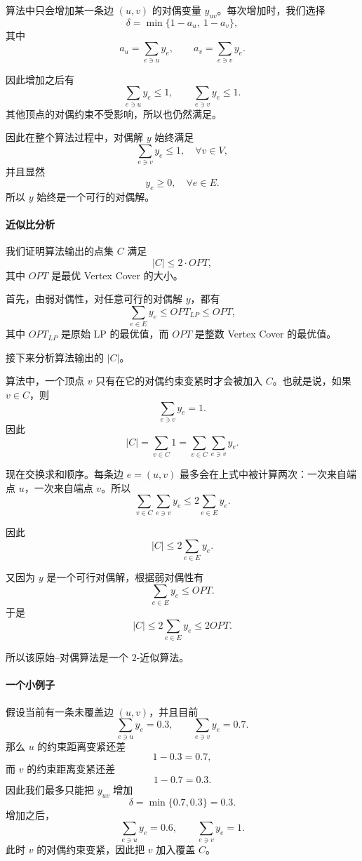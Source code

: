 \documentclass[UTF8,openany,12pt]{ctexbook}
\theoremstyle{remark}
\begin{document}
算法中只会增加某一条边 \((u,v)\) 的对偶变量 \(y_{uv}\)。每次增加时，我们选择
\[
  \delta=\min\{1-a_u,\ 1-a_v\},
\]
其中
\[
  a_u=\sum_{e\ni u}y_e,\qquad a_v=\sum_{e\ni v}y_e.
\]

因此增加之后有
\[
  \sum_{e\ni u}y_e \le 1,
  \qquad
  \sum_{e\ni v}y_e \le 1.
\]
其他顶点的对偶约束不受影响，所以也仍然满足。

因此在整个算法过程中，对偶解 \(y\) 始终满足
\[
  \sum_{e\ni v}y_e\le 1,\quad \forall v\in V,
\]
并且显然
\[
  y_e\ge 0,\quad \forall e\in E.
\]
所以 \(y\) 始终是一个可行的对偶解。

\paragraph{近似比分析}

我们证明算法输出的点集 \(C\) 满足
\[
  |C| \le 2\cdot OPT,
\]
其中 \(OPT\) 是最优 Vertex Cover 的大小。

首先，由弱对偶性，对任意可行的对偶解 \(y\)，都有
\[
  \sum_{e\in E} y_e \le OPT_{LP} \le OPT,
\]
其中 \(OPT_{LP}\) 是原始 LP 的最优值，而 \(OPT\) 是整数 Vertex Cover 的最优值。

接下来分析算法输出的 \(|C|\)。

算法中，一个顶点 \(v\) 只有在它的对偶约束变紧时才会被加入 \(C\)。也就是说，如果 \(v\in C\)，则
\[
  \sum_{e\ni v}y_e = 1.
\]
因此
\[
  |C|
  = \sum_{v\in C} 1
  = \sum_{v\in C}\sum_{e\ni v} y_e.
\]

现在交换求和顺序。每条边 \(e=(u,v)\) 最多会在上式中被计算两次：一次来自端点 \(u\)，一次来自端点 \(v\)。所以
\[
  \sum_{v\in C}\sum_{e\ni v} y_e
  \le 2\sum_{e\in E} y_e.
\]

因此
\[
  |C|
  \le 2\sum_{e\in E} y_e.
\]

又因为 \(y\) 是一个可行对偶解，根据弱对偶性有
\[
  \sum_{e\in E} y_e \le OPT.
\]
于是
\[
  |C|
  \le 2\sum_{e\in E}y_e
  \le 2OPT.
\]

所以该原始--对偶算法是一个 \(2\)-近似算法。

\paragraph{一个小例子}

假设当前有一条未覆盖边 \((u,v)\)，并且目前
\[
  \sum_{e\ni u}y_e = 0.3,\qquad
  \sum_{e\ni v}y_e = 0.7.
\]
那么 \(u\) 的约束距离变紧还差
\[
  1-0.3=0.7,
\]
而 \(v\) 的约束距离变紧还差
\[
  1-0.7=0.3.
\]
因此我们最多只能把 \(y_{uv}\) 增加
\[
  \delta=\min\{0.7,0.3\}=0.3.
\]
增加之后，
\[
  \sum_{e\ni u}y_e = 0.6,
  \qquad
  \sum_{e\ni v}y_e = 1.
\]
此时 \(v\) 的对偶约束变紧，因此把 \(v\) 加入覆盖 \(C\)。
\end{document}
